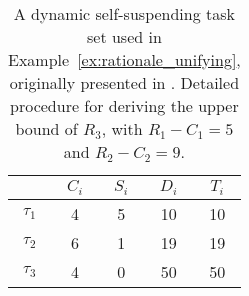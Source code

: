 \begin{table}[t]
\centering
    \begin{tabular}{|c|c|c|c|c|}
 \hline
        & $C_i$ &  $S_i$&  $D_i$ & $T_i$\\ 
        \hline
        $\tau_1$ & 4 & 5 &  10 & 10\\ 
        $\tau_2$ &  6&  1& 19 & 19 \\ 
        $\tau_3$ & 4 & 0  & 50 & 50 \\ 
        \hline
    \end{tabular} 
    \centering
    \renewcommand{\arraystretch}{1.7}
    \caption{A dynamic self-suspending task set used in Example~\ref{ex:rationale_unifying}, originally presented in \cite{ChenECRTS2016-suspension}. Detailed procedure for deriving the upper bound of $R_3$, with $R_1-C_1=5$ and $R_2-C_2=9$.}
    \label{tab:example-unifying-calculation}
  \end{table}

